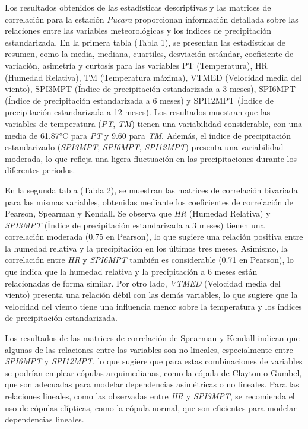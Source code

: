 \begin{figure}[htbp]
\end{figure}



Los resultados obtenidos de las estadísticas descriptivas y las matrices de correlación para la estación \textit{Pucara} proporcionan información detallada sobre las relaciones entre las variables meteorológicas y los índices de precipitación estandarizada. En la primera tabla (Tabla 1), se presentan las estadísticas de resumen, como la media, mediana, cuartiles, desviación estándar, coeficiente de variación, asimetría y curtosis para las variables PT (Temperatura), HR (Humedad Relativa), TM (Temperatura máxima), VTMED (Velocidad media del viento), SPI3MPT (Índice de precipitación estandarizada a 3 meses), SPI6MPT (Índice de precipitación estandarizada a 6 meses) y SPI12MPT (Índice de precipitación estandarizada a 12 meses). Los resultados muestran que las variables de temperatura (\textit{PT}, \textit{TM}) tienen una variabilidad considerable, con una media de 61.87°C para \textit{PT} y 9.60 para \textit{TM}. Además, el índice de precipitación estandarizado (\textit{SPI3MPT}, \textit{SPI6MPT}, \textit{SPI12MPT}) presenta una variabilidad moderada, lo que refleja una ligera fluctuación en las precipitaciones durante los diferentes periodos.

En la segunda tabla (Tabla 2), se muestran las matrices de correlación bivariada para las mismas variables, obtenidas mediante los coeficientes de correlación de Pearson, Spearman y Kendall. Se observa que \textit{HR} (Humedad Relativa) y \textit{SPI3MPT} (Índice de precipitación estandarizada a 3 meses) tienen una correlación moderada (0.75 en Pearson), lo que sugiere una relación positiva entre la humedad relativa y la precipitación en los últimos tres meses. Asimismo, la correlación entre \textit{HR} y \textit{SPI6MPT} también es considerable (0.71 en Pearson), lo que indica que la humedad relativa y la precipitación a 6 meses están relacionadas de forma similar. Por otro lado, \textit{VTMED} (Velocidad media del viento) presenta una relación débil con las demás variables, lo que sugiere que la velocidad del viento tiene una influencia menor sobre la temperatura y los índices de precipitación estandarizada.

Los resultados de las matrices de correlación de Spearman y Kendall indican que algunas de las relaciones entre las variables son no lineales, especialmente entre \textit{SPI6MPT} y \textit{SPI12MPT}, lo que sugiere que para estas combinaciones de variables se podrían emplear cópulas arquimedianas, como la cópula de Clayton o Gumbel, que son adecuadas para modelar dependencias asimétricas o no lineales. Para las relaciones lineales, como las observadas entre \textit{HR} y \textit{SPI3MPT}, se recomienda el uso de cópulas elípticas, como la cópula normal, que son eficientes para modelar dependencias lineales.

